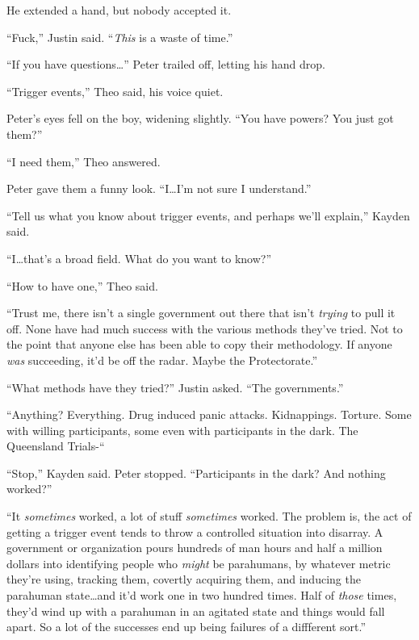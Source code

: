 He extended a hand, but nobody accepted it.



``Fuck,'' Justin said.  ``\emph{This} is a waste of time.''



``If you have questions\ldots'' Peter trailed off, letting his hand drop.



``Trigger events,'' Theo said, his voice quiet.



Peter's eyes fell on the boy, widening slightly.  ``You have powers?  You just got them?''



``I need them,'' Theo answered.



Peter gave them a funny look.  ``I\ldots I'm not sure I understand.''



``Tell us what you know about trigger events, and perhaps we'll explain,'' Kayden said.



``I\ldots that's a broad field.  What do you want to know?''



``How to have one,'' Theo said.



``Trust me, there isn't a single government out there that isn't \emph{trying} to pull it off.  None have had much success with the various methods they've tried.  Not to the point that anyone else has been able to copy their methodology.  If anyone \emph{was} succeeding, it'd be off the radar.  Maybe the Protectorate.''



``What methods have they tried?'' Justin asked.  ``The governments.''



``Anything?  Everything.  Drug induced panic attacks.  Kidnappings.  Torture.  Some with willing participants, some even with participants in the dark.  The Queensland Trials-``



``Stop,'' Kayden said.  Peter stopped.  ``Participants in the dark?  And nothing worked?''



``It \emph{sometimes} worked, a lot of stuff \emph{sometimes} worked.  The problem is, the act of getting a trigger event tends to throw a controlled situation into disarray.  A government or organization pours hundreds of man hours and half a million dollars into identifying people who \emph{might} be parahumans, by whatever metric they're using, tracking them, covertly acquiring them, and inducing the parahuman state\ldots and it'd work one in two hundred times.  Half of \emph{those} times, they'd wind up with a parahuman in an agitated state and things would fall apart.  So a lot of the successes end up being failures of a diffferent sort.''



